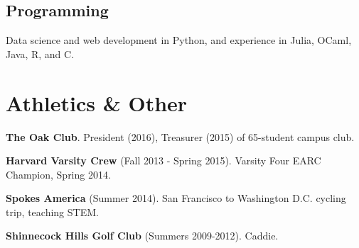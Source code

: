 \documentclass[letterpaper]{amsart}
\def\footerlink{}
\renewenvironment{itemize}{
  \begin{list}{}{
    \setlength{\leftmargin}{1.5em}
  }
}{
  \end{list}
}
\begin{document}
\subsection*{Programming}
\begin{itemize} 
\item Data science and web development in Python, and experience in Julia, OCaml, Java, R, and C.
\end{itemize}

\renewenvironment{itemize}{
  \begin{list}{}{
    \setlength{\leftmargin}{0em}
  }
}{
  \end{list}
}

\section*{Athletics \& Other}
\begin{itemize}
\item \textbf{The Oak Club}. President (2016), Treasurer (2015) of 65-student campus club.
\item \textbf{Harvard Varsity Crew} (Fall 2013 - Spring 2015). Varsity Four EARC Champion, Spring 2014.
\item \textbf{Spokes America} (Summer 2014). San Francisco to Washington D.C. cycling trip, teaching STEM.
\item \textbf{Shinnecock Hills Golf Club} (Summers 2009-2012). Caddie. 
\end{itemize}

\bigskip

\end{document}
